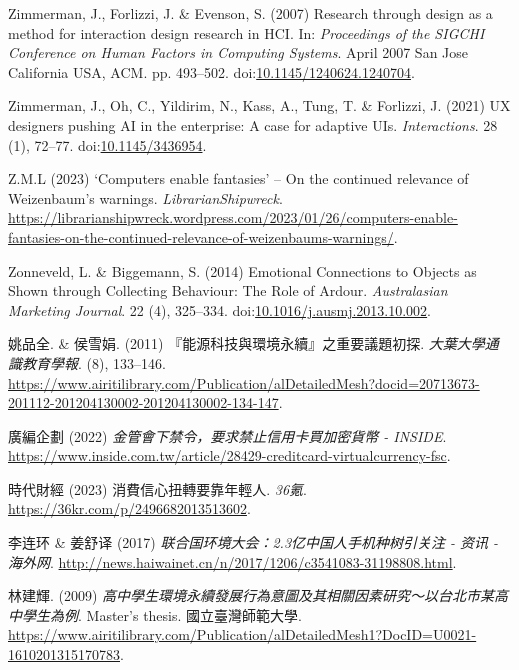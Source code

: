 \documentclass[
  letterpaper,
  DIV=11,
  numbers=noendperiod]{scrartcl}
\newlength{\cslhangindent}
\newenvironment{CSLReferences}[2] %
 {\begin{list}{}{%
  \setlength{\itemindent}{0pt}
  \setlength{\leftmargin}{0pt}
  \setlength{\parsep}{0pt}
  \ifodd #1
   \setlength{\leftmargin}{\cslhangindent}
   \setlength{\itemindent}{-1\cslhangindent}
  \fi
  \setlength{\itemsep}{#2\baselineskip}}}
 {\end{list}}
\begin{document}
\begin{CSLReferences}{0}{1}
Zimmerman, J., Forlizzi, J. \& Evenson, S. (2007) Research through
design as a method for interaction design research in {HCI}. In:
\emph{Proceedings of the {SIGCHI Conference} on {Human Factors} in
{Computing Systems}}. April 2007 San Jose California USA, ACM. pp.
493--502.
doi:\href{https://doi.org/10.1145/1240624.1240704}{10.1145/1240624.1240704}.

Zimmerman, J., Oh, C., Yildirim, N., Kass, A., Tung, T. \& Forlizzi, J.
(2021) {UX} designers pushing {AI} in the enterprise: A case for
adaptive {UIs}. \emph{Interactions}. 28 (1), 72--77.
doi:\href{https://doi.org/10.1145/3436954}{10.1145/3436954}.

Z.M.L (2023) {`{Computers} enable fantasies'} -- {On} the continued
relevance of {Weizenbaum}'s warnings. \emph{LibrarianShipwreck}.
\url{https://librarianshipwreck.wordpress.com/2023/01/26/computers-enable-fantasies-on-the-continued-relevance-of-weizenbaums-warnings/}.

Zonneveld, L. \& Biggemann, S. (2014) Emotional {Connections} to
{Objects} as {Shown} through {Collecting Behaviour}: {The Role} of
{Ardour}. \emph{Australasian Marketing Journal}. 22 (4), 325--334.
doi:\href{https://doi.org/10.1016/j.ausmj.2013.10.002}{10.1016/j.ausmj.2013.10.002}.

姚品全. \& 侯雪娟. (2011) {『能源科技與環境永續』之重要議題初探}.
\emph{大葉大學通識教育學報}. (8), 133--146.
\url{https://www.airitilibrary.com/Publication/alDetailedMesh?docid=20713673-201112-201204130002-201204130002-134-147}.

廣編企劃 (2022) \emph{金管會下禁令，要求禁止信用卡買加密貨幣 -
{INSIDE}}.
\url{https://www.inside.com.tw/article/28429-creditcard-virtualcurrency-fsc}.

時代財經 (2023) 消費信心扭轉要靠年輕人. \emph{36氪}.
\url{https://36kr.com/p/2496682013513602}.

李连环 \& 姜舒译 (2017) \emph{联合国环境大会：2.3亿中国人手机种树引关注
- 资讯 - 海外网}.
\url{http://news.haiwainet.cn/n/2017/1206/c3541083-31198808.html}.

林建輝. (2009)
\emph{{高中學生環境永續發展行為意圖及其相關因素研究～以台北市某高中學生為例}}.
Master's thesis. 國立臺灣師範大學.
\url{https://www.airitilibrary.com/Publication/alDetailedMesh1?DocID=U0021-1610201315170783}.


\end{CSLReferences}
\end{document}
